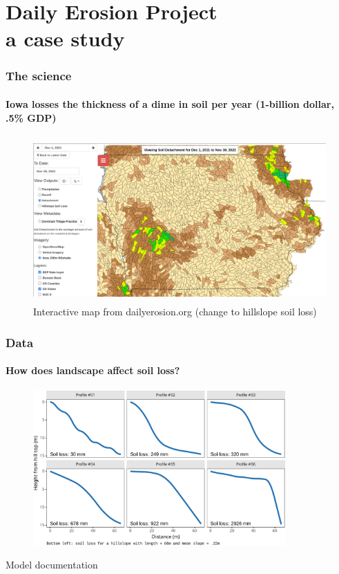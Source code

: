 \documentclass{snedecorbeamer}
\begin{document}
\section{Daily Erosion Project \\ {\small a case study}}

\begin{frame}
  \frametitle{The science}
  \framesubtitle{Iowa losses the thickness of a dime in soil per year (1-billion
    dollar, .5\% GDP)}

  \begin{figure}
    \centering
    \includegraphics[height=17em]{inc/dep_detachment_map_20220630_168.png}
      \caption{%
        \href{1}{}
        Interactive map from dailyerosion.org (change to hillslope soil loss)}
  \end{figure}
\end{frame}

\begin{frame}
  \frametitle{Data}
  \framesubtitle{How does landscape affect soil loss?}

  \begin{figure}
    \centering
    \includegraphics[height=16em]{inc/wepp_elevation_profiles}
  \end{figure}

  {\tiny
    Model documentation}
\end{frame}
\end{document}
